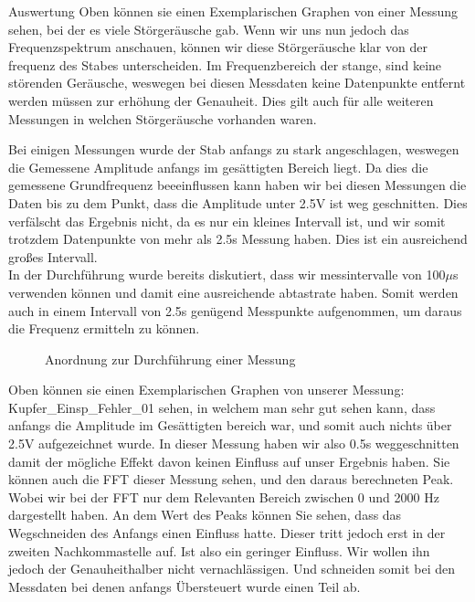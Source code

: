 \documentclass[twoside]{protokoll}
\begin{document}
\begin{aufgabe}{Auswertung}
Oben können sie einen Exemplarischen Graphen von einer Messung sehen, bei der es viele Störgeräusche gab. Wenn wir uns nun jedoch das Frequenzspektrum anschauen, können wir diese Störgeräusche klar von der frequenz des Stabes unterscheiden. Im Frequenzbereich der stange, sind keine störenden Geräusche, weswegen bei diesen Messdaten keine Datenpunkte entfernt werden müssen zur erhöhung der Genauheit. Dies gilt auch für alle weiteren Messungen in welchen Störgeräusche vorhanden waren. 

Bei einigen Messungen wurde der Stab anfangs zu stark angeschlagen, weswegen die Gemessene Amplitude anfangs im gesättigten Bereich liegt. Da dies die gemessene Grundfrequenz beeeinflussen kann  haben wir bei diesen Messungen die Daten bis zu dem Punkt, dass die Amplitude unter 2.5V ist weg geschnitten. Dies verfälscht das Ergebnis nicht, da es nur ein kleines Intervall ist, und wir somit trotzdem Datenpunkte von mehr als 2.5s Messung haben. Dies ist ein ausreichend großes Intervall.\\
In der Durchführung wurde bereits diskutiert, dass wir messintervalle von 100$\mu$s verwenden können und damit eine ausreichende abtastrate haben. Somit werden auch in einem Intervall von 2.5s  genügend Messpunkte aufgenommen, um daraus die Frequenz ermitteln zu können.

\begin{figure}[H]
  \centering
  \hfill
  \caption{Anordnung zur Durchführung einer Messung}
\end{figure}


Oben können sie einen Exemplarischen Graphen von unserer Messung: Kupfer\_Einsp\_Fehler\_01 sehen, in welchem man sehr gut sehen kann, dass anfangs die Amplitude im Gesättigten bereich war, und somit auch nichts über 2.5V aufgezeichnet wurde. In dieser Messung haben wir also 0.5s weggeschnitten damit der mögliche Effekt davon keinen Einfluss auf unser Ergebnis haben.
Sie können auch die FFT dieser Messung sehen, und den daraus berechneten Peak. Wobei wir bei der FFT nur dem Relevanten Bereich zwischen 0 und 2000 Hz dargestellt haben. An dem Wert des Peaks können Sie sehen, dass das Wegschneiden des Anfangs einen Einfluss hatte. Dieser tritt jedoch erst in der zweiten Nachkommastelle auf. Ist also ein geringer Einfluss. Wir wollen ihn jedoch der Genauheithalber nicht vernachlässigen. Und schneiden somit bei den Messdaten bei denen anfangs Übersteuert wurde einen Teil ab. 



\end{aufgabe}
\end{document}
